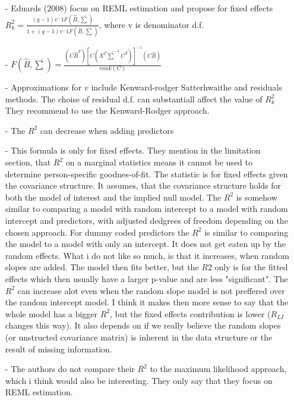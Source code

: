 \documentclass[11pt, a4paper]{article}\usepackage[]{graphicx}\usepackage[]{color}
\begin{document}
\begin{enumerate}


\item[-] Eduards (2008) focus on REML estimation and propose for fixed effects $R^2_{k} =  \frac{(q-1) v^-1 F(\hat{B}, \hat{\sum})}{1 + (q-1) v^-1 F(\hat{B}, \hat{\sum}) } $, where v is denominator d.f. 
\item[-] $ F(\hat{B}, \hat{\sum}) = \frac{(C\hat{B}^T){\left[C(X^T\hat{\sum}^{-1}C^T)\right]}^{-1}(C\hat{B})}{rank(C)} $


\item[-] Approximations for $v$ include Kenward-rodger Satterhwaithe and residuals methods. The choise of residual d.f. can substantiall affect the value of $ R^2_{k}$  They recommend to use the Kenward-Rodger approach.

\item[-] The $R^2$ can decrease when adding predictors

\item[-]  This formula is only for fixed effects.  They mention in the limitation section, that $R^2$ on a marginal statistics means it cannot be used to determine person-specific goodnes-of-fit. The statistic is for fixed effects given the covariance structure. It assumes, that the covariance structure holds for both the model of interest and the implied null model. The $R^2$ is somehow similar to comparing a model with random intercept to a model with random intercept and predictors, with adjusted dedgrees of freedom depending on the chosen approach. For dummy coded predictors the $R^2$ is similar to comparing the model to a model with only an intercept. It does not get eaten up by the random effects. What i do not like so much, is that it increases, when random slopes are added. The model then fits better, but the $R2$ only is for the fitted effects which then usually have a larger p-value and are less "significant". The $R^2$ can increase alot even when the random slope model is not preffered over the random intercept model. I think it makes then more sense to say that the whole model has a bigger $R^2$, but the fixed effects contribution is lower ($R_{LI}$ changes this way). It also depends on if we really believe the random slopes (or unstructed covariance matrix) is inherent in the data structure or the result of missing information. 

\item[-] The authors do not compare their $R^2$ to the maximum likelihood approach, which i think would also be interesting. They only say that they focus on REML estimation.



\end{enumerate}
\end{document}
